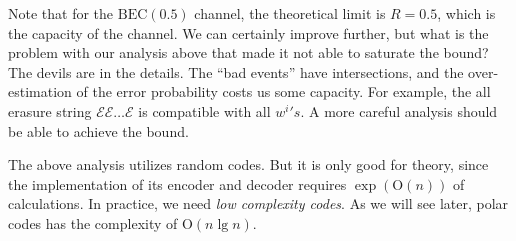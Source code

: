 Note that for the $\mathrm{BEC}(0.5)$ channel, the theoretical limit is $R=0.5$, which is the capacity of the channel. We can certainly improve further, but what is the problem with our analysis above that made it not able to saturate the bound? The devils are in the details. The ``bad events'' have intersections, and the over-estimation of the error probability costs us some capacity. For example, the all erasure string $\mathcal{EE\ldots E}$ is compatible with all ${w^i}'s$. A more careful analysis should be able to achieve the bound.

\begin{remark}
    The above analysis utilizes random codes. But it is only good for theory, since the implementation of its encoder and decoder requires $\exp(\mathrm{O}(n))$ of calculations. In practice, we need \textit{low complexity codes}. As we will see later, polar codes has the complexity of $\mathrm{O}(n\lg n)$.
\end{remark}

